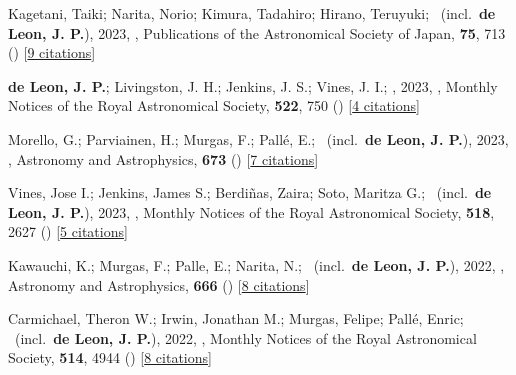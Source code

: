 \item[{\color{numcolor}\scriptsize52}] Kagetani, Taiki; Narita, Norio; Kimura, Tadahiro; Hirano, Teruyuki; \etal\ (incl.\ \textbf{de Leon, J. P.}), 2023, , Publications of the Astronomical Society of Japan, \textbf{75}, 713 () [\href{https://ui.adsabs.harvard.edu/abs/2023PASJ...75..713K}{9 citations}]

\item[{\color{numcolor}\scriptsize51}] \textbf{de Leon, J. P.}; Livingston, J. H.; Jenkins, J. S.; Vines, J. I.; \etal, 2023, , Monthly Notices of the Royal Astronomical Society, \textbf{522}, 750 () [\href{https://ui.adsabs.harvard.edu/abs/2023MNRAS.522..750D}{4 citations}]

\item[{\color{numcolor}\scriptsize50}] Morello, G.; Parviainen, H.; Murgas, F.; Pall{\'e}, E.; \etal\ (incl.\ \textbf{de Leon, J. P.}), 2023, , Astronomy and Astrophysics, \textbf{673} () [\href{https://ui.adsabs.harvard.edu/abs/2023A&A...673A..32M}{7 citations}]

\item[{\color{numcolor}\scriptsize49}] Vines, Jose I.; Jenkins, James S.; Berdi{\~n}as, Zaira; Soto, Maritza G.; \etal\ (incl.\ \textbf{de Leon, J. P.}), 2023, , Monthly Notices of the Royal Astronomical Society, \textbf{518}, 2627 () [\href{https://ui.adsabs.harvard.edu/abs/2023MNRAS.518.2627V}{5 citations}]

\item[{\color{numcolor}\scriptsize48}] Kawauchi, K.; Murgas, F.; Palle, E.; Narita, N.; \etal\ (incl.\ \textbf{de Leon, J. P.}), 2022, , Astronomy and Astrophysics, \textbf{666} () [\href{https://ui.adsabs.harvard.edu/abs/2022A&A...666A...4K}{8 citations}]

\item[{\color{numcolor}\scriptsize47}] Carmichael, Theron W.; Irwin, Jonathan M.; Murgas, Felipe; Pall{\'e}, Enric; \etal\ (incl.\ \textbf{de Leon, J. P.}), 2022, , Monthly Notices of the Royal Astronomical Society, \textbf{514}, 4944 () [\href{https://ui.adsabs.harvard.edu/abs/2022MNRAS.514.4944C}{8 citations}]

